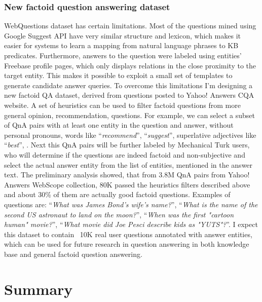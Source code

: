 \subsubsection{New factoid question answering dataset}
\label{section:factoid:proposal:experiments:dataset}


WebQuestions dataset has certain limitations.
Most of the questions mined using Google Suggest API have very similar structure and lexicon, which makes it easier for systems to learn a mapping from natural language phrases to KB predicates.
Furthermore, answers to the question were labeled using entities' Freebase profile pages, which only displays relations in the close proximity to the target entity.
This makes it possible to exploit a small set of templates to generate candidate answer queries.
To overcome this limitations I'm designing a new factoid QA dataset, derived from questions posted to Yahoo! Answers CQA website.
A set of heuristics can be used to filter factoid questions from more general opinion, recommendation, \etc questions.
For example, we can select a subset of QnA pairs with at least one entity in the question and answer, without personal pronouns, words like ``\textit{recommend}'', ``\textit{suggest}'', superlative adjectives like ``\textit{best}'', \etc.
Next this QnA pairs will be further labeled by Mechanical Turk users, who will determine if the questions are indeed factoid and non-subjective and select the actual answer entity from the list of entities, mentioned in the answer text.
The preliminary analysis showed, that from 3.8M QnA pairs from Yahoo! Answers WebScope collection, 80K passed the heuristics filters described above and about 30\% of them are actually good factoid questions.
Examples of questions are: ``\textit{What was James Bond's wife's name?}'', ``\textit{What is the name of the second US astronaut to land on the moon?}'', ``\textit{When was the first "cartoon human" movie?}'', ``\textit{What movie did Joe Pesci describe kids as "YUTS"?}''.
I expect this dataset to contain ~10K real user questions annotated with answer entities, which can be used for future research in question answering in both knowledge base and general factoid question answering.

\section{Summary}
\label{section:factoid:summary}

